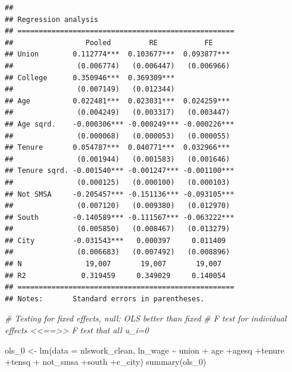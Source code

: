 \documentclass[
]{article}
\newenvironment{Shaded}{\begin{snugshade}}{\end{snugshade}}
\newcommand{\AttributeTok}[1]{\textcolor[rgb]{0.77,0.63,0.00}{#1}}
\newcommand{\CommentTok}[1]{\textcolor[rgb]{0.56,0.35,0.01}{\textit{#1}}}
\newcommand{\FunctionTok}[1]{\textcolor[rgb]{0.00,0.00,0.00}{#1}}
\newcommand{\NormalTok}[1]{#1}
\newcommand{\OtherTok}[1]{\textcolor[rgb]{0.56,0.35,0.01}{#1}}
\newcommand{\SpecialCharTok}[1]{\textcolor[rgb]{0.00,0.00,0.00}{#1}}
\begin{document}
\begin{verbatim}
## 
## Regression analysis
## ===================================================
##                 Pooled         RE           FE     
## Union        0.112774***  0.103677***  0.093877*** 
##               (0.006774)   (0.006447)   (0.006966) 
## College      0.350946***  0.369309***              
##               (0.007149)   (0.012344)              
## Age          0.022481***  0.023031***  0.024259*** 
##               (0.004249)   (0.003317)   (0.003447) 
## Age sqrd.    -0.000306*** -0.000249*** -0.000226***
##               (0.000068)   (0.000053)   (0.000055) 
## Tenure       0.054787***  0.040771***  0.032966*** 
##               (0.001944)   (0.001583)   (0.001646) 
## Tenure sqrd. -0.001540*** -0.001247*** -0.001100***
##               (0.000125)   (0.000100)   (0.000103) 
## Not SMSA     -0.205457*** -0.151136*** -0.093105***
##               (0.007120)   (0.009380)   (0.012970) 
## South        -0.140589*** -0.111567*** -0.063222***
##               (0.005850)   (0.008467)   (0.013279) 
## City         -0.031543***   0.000397     0.011409  
##               (0.006683)   (0.007492)   (0.008896) 
## N               19,007       19,007       19,007   
## R2             0.319459     0.349029     0.140054  
## ===================================================
## Notes:       Standard errors in parentheses.
\end{verbatim}

\begin{Shaded}
\begin{Highlighting}[]
\CommentTok{\# Testing for fixed effects, null: OLS better than fixed}
\CommentTok{\# \textquotesingle{}F test for individual effects\textquotesingle{} \textless{}\textless{}==\textgreater{}\textgreater{} \textquotesingle{}F test that all u\_i=0\textquotesingle{}}

\NormalTok{  ols\_0 }\OtherTok{\textless{}{-}} \FunctionTok{lm}\NormalTok{(}\AttributeTok{data =}\NormalTok{ nlswork\_clean, ln\_wage }\SpecialCharTok{\textasciitilde{}}\NormalTok{ union }\SpecialCharTok{+}
\NormalTok{                age }\SpecialCharTok{+}\NormalTok{agesq }\SpecialCharTok{+}\NormalTok{tenure }\SpecialCharTok{+}\NormalTok{tensq }\SpecialCharTok{+}
\NormalTok{                not\_smsa }\SpecialCharTok{+}\NormalTok{south }\SpecialCharTok{+}\NormalTok{c\_city)}
      \FunctionTok{summary}\NormalTok{(ols\_0)}
\end{Highlighting}
\end{Shaded}
\end{document}
